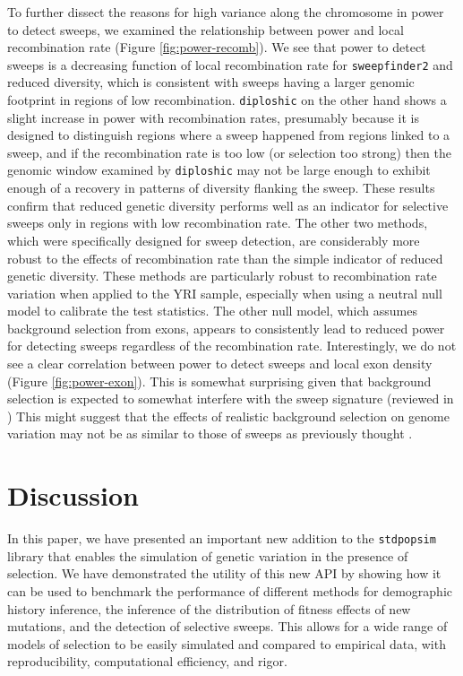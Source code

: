 \documentclass[hidelinks]{article}
\newcommand{\stdpopsim}{\texttt{stdpopsim}\xspace}
\newcommand{\sweepfinder}{\texttt{sweepfinder2}\xspace}
\newcommand{\diploshic}{\texttt{diploshic}\xspace}
\begin{document}
    To further dissect the reasons for high variance along the chromosome in power to detect sweeps,
    we examined the relationship between power and local recombination rate (Figure \ref{fig:power-recomb}).
    We see that power to detect sweeps is
    a decreasing function of local recombination rate for \sweepfinder and reduced diversity,
    which is consistent with sweeps having a larger genomic footprint in regions of low
    recombination.
    \diploshic on the other hand shows a slight increase in power with recombination rates,
    presumably because it is designed to distinguish regions where a sweep happened from regions linked to a sweep,
    and if the recombination rate is too low (or selection too strong) then the genomic window examined by \diploshic may
    not be large enough to exhibit enough of a recovery in patterns of diversity flanking the sweep.
    These results confirm that reduced genetic diversity performs well as an indicator for selective sweeps only in regions with
    low recombination rate.
    The other two methods, which were specifically designed for sweep detection, are considerably more robust
    to the effects of recombination rate than the simple indicator of reduced genetic diversity.
    These methods are particularly robust to recombination rate variation when applied to
    the YRI sample, especially when using a neutral null model to calibrate the test statistics.
    The other null model, which assumes background selection from exons,
    appears to consistently lead to reduced power for detecting sweeps regardless of the recombination rate.
    Interestingly, we do not see a clear correlation between power to detect sweeps and
    local exon density (Figure \ref{fig:power-exon}).
    This is somewhat surprising given that background selection is expected to somewhat interfere with the sweep signature (reviewed in \citet{stephan2010genetic}) 
    This might suggest that the effects of realistic background selection on genome variation
    may not be as similar to those of sweeps as previously thought \citep{schrider2020background}.

\section*{Discussion}
    \label{Discussion}
    In this paper, we have presented an important new addition to the \stdpopsim{} library
    that enables the simulation of genetic variation in the presence of selection.
    We have demonstrated the utility of this new API by showing how it can be used to benchmark
    the performance of different methods for demographic history inference, the inference of the distribution
    of fitness effects of new mutations, and the detection of selective sweeps.
    This allows for a wide range of models of selection to be easily simulated and compared to
    empirical data, with reproducibility, computational efficiency, and rigor.
\end{document}
